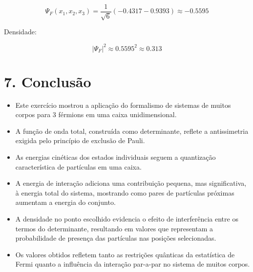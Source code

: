 \documentclass[12pt,a4paper]{article}
\begin{document}
\[
\Psi_F(x_1,x_2,x_3) = \frac{1}{\sqrt{6}} (-0.4317 - 0.9393) \approx -0.5595
\]

Densidade:

\[
|\Psi_F|^2 \approx 0.5595^2 \approx 0.313
\]

\section*{7. Conclusão}

\begin{itemize}
  \item Este exercício mostrou a aplicação do formalismo de sistemas de muitos corpos para 3 férmions em uma caixa unidimensional.\\
  \item A função de onda total, construída como determinante, reflete a antissimetria exigida pelo princípio de exclusão de Pauli.\\
  \item As energias cinéticas dos estados individuais seguem a quantização característica de partículas em uma caixa.\\
  \item A energia de interação adiciona uma contribuição pequena, mas significativa, à energia total do sistema, mostrando como pares de partículas próximas aumentam a energia do conjunto.\\
  \item A densidade no ponto escolhido evidencia o efeito de interferência entre os termos do determinante, resultando em valores que representam a probabilidade de presença das partículas nas posições selecionadas.\\
  \item Os valores obtidos refletem tanto as restrições quânticas da estatística de Fermi quanto a influência da interação par-a-par no sistema de muitos corpos.
\end{itemize}
\end{document}
